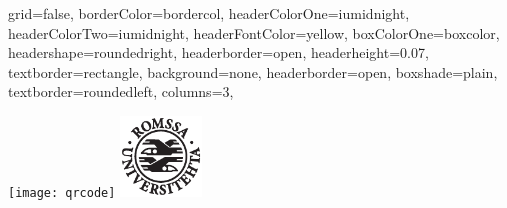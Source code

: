 \documentclass[fontscale=0.35,landscape,paperwidth=841mm,paperheight=1189mm]{baposter}  %
\begin{document}
	\setlength{\pdfpageheight}{\paperheight}
	\setlength{\pdfpagewidth}{\paperwidth}


	\begin{poster}{
		grid=false,
		borderColor=bordercol,
		headerColorOne=iumidnight,
		headerColorTwo=iumidnight,
		headerFontColor=yellow,
		boxColorOne=boxcolor,
		headershape=roundedright,
		headerborder=open,
		headerheight=0.07\textheight,
		textborder=rectangle,
		background=none,
		headerborder=open,
		boxshade=plain,
		textborder=roundedleft,
		columns=3,
	}{ %
		\setlength\fboxsep{0.5em}
		\setlength\fboxrule{0pt}
		\texttt{[image: qrcode]}
		\includegraphics[height=5.8em]{uitlogo}\hspace{1em}

}
\end{poster}
\end{document}
